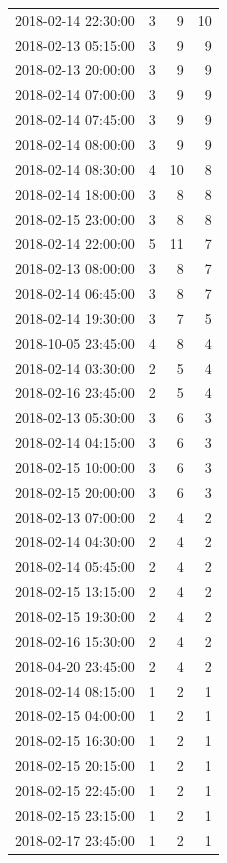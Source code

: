 \begin{tabular}{lrrr}
2018-02-14 22:30:00 & 3 & 9 & 10 \\
2018-02-13 05:15:00 & 3 & 9 & 9 \\
2018-02-13 20:00:00 & 3 & 9 & 9 \\
2018-02-14 07:00:00 & 3 & 9 & 9 \\
2018-02-14 07:45:00 & 3 & 9 & 9 \\
2018-02-14 08:00:00 & 3 & 9 & 9 \\
2018-02-14 08:30:00 & 4 & 10 & 8 \\
2018-02-14 18:00:00 & 3 & 8 & 8 \\
2018-02-15 23:00:00 & 3 & 8 & 8 \\
2018-02-14 22:00:00 & 5 & 11 & 7 \\
2018-02-13 08:00:00 & 3 & 8 & 7 \\
2018-02-14 06:45:00 & 3 & 8 & 7 \\
2018-02-14 19:30:00 & 3 & 7 & 5 \\
2018-10-05 23:45:00 & 4 & 8 & 4 \\
2018-02-14 03:30:00 & 2 & 5 & 4 \\
2018-02-16 23:45:00 & 2 & 5 & 4 \\
2018-02-13 05:30:00 & 3 & 6 & 3 \\
2018-02-14 04:15:00 & 3 & 6 & 3 \\
2018-02-15 10:00:00 & 3 & 6 & 3 \\
2018-02-15 20:00:00 & 3 & 6 & 3 \\
2018-02-13 07:00:00 & 2 & 4 & 2 \\
2018-02-14 04:30:00 & 2 & 4 & 2 \\
2018-02-14 05:45:00 & 2 & 4 & 2 \\
2018-02-15 13:15:00 & 2 & 4 & 2 \\
2018-02-15 19:30:00 & 2 & 4 & 2 \\
2018-02-16 15:30:00 & 2 & 4 & 2 \\
2018-04-20 23:45:00 & 2 & 4 & 2 \\
2018-02-14 08:15:00 & 1 & 2 & 1 \\
2018-02-15 04:00:00 & 1 & 2 & 1 \\
2018-02-15 16:30:00 & 1 & 2 & 1 \\
2018-02-15 20:15:00 & 1 & 2 & 1 \\
2018-02-15 22:45:00 & 1 & 2 & 1 \\
2018-02-15 23:15:00 & 1 & 2 & 1 \\
2018-02-17 23:45:00 & 1 & 2 & 1 \\
\bottomrule
\end{tabular}
